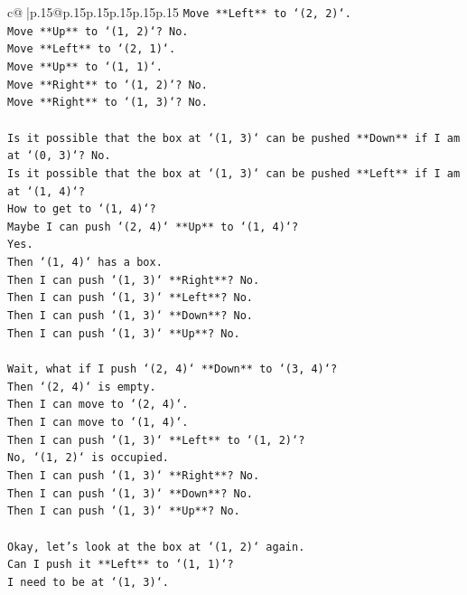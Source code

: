 \documentclass{article}
\begin{document}
{\begin{supertabular}{c@{$\;$}|p{.15\linewidth}@{}p{.15\linewidth}p{.15\linewidth}p{.15\linewidth}p{.15\linewidth}p{.15\linewidth}}
{{{\texttt{Move **Left** to `(2, 2)`.} \\
\texttt{Move **Up** to `(1, 2)`? No.} \\
\texttt{Move **Left** to `(2, 1)`.} \\
\texttt{Move **Up** to `(1, 1)`.} \\
\texttt{Move **Right** to `(1, 2)`? No.} \\
\texttt{Move **Right** to `(1, 3)`? No.} \\
\\ 
\texttt{Is it possible that the box at `(1, 3)` can be pushed **Down** if I am at `(0, 3)`? No.} \\
\texttt{Is it possible that the box at `(1, 3)` can be pushed **Left** if I am at `(1, 4)`?} \\
\texttt{How to get to `(1, 4)`?} \\
\texttt{Maybe I can push `(2, 4)` **Up** to `(1, 4)`?} \\
\texttt{Yes.} \\
\texttt{Then `(1, 4)` has a box.} \\
\texttt{Then I can push `(1, 3)` **Right**? No.} \\
\texttt{Then I can push `(1, 3)` **Left**? No.} \\
\texttt{Then I can push `(1, 3)` **Down**? No.} \\
\texttt{Then I can push `(1, 3)` **Up**? No.} \\
\\ 
\texttt{Wait, what if I push `(2, 4)` **Down** to `(3, 4)`?} \\
\texttt{Then `(2, 4)` is empty.} \\
\texttt{Then I can move to `(2, 4)`.} \\
\texttt{Then I can move to `(1, 4)`.} \\
\texttt{Then I can push `(1, 3)` **Left** to `(1, 2)`?} \\
\texttt{No, `(1, 2)` is occupied.} \\
\texttt{Then I can push `(1, 3)` **Right**? No.} \\
\texttt{Then I can push `(1, 3)` **Down**? No.} \\
\texttt{Then I can push `(1, 3)` **Up**? No.} \\
\\ 
\texttt{Okay, let's look at the box at `(1, 2)` again.} \\
\texttt{Can I push it **Left** to `(1, 1)`?} \\
\texttt{I need to be at `(1, 3)`.} \\
}}}
\end{supertabular}}
\end{document}
